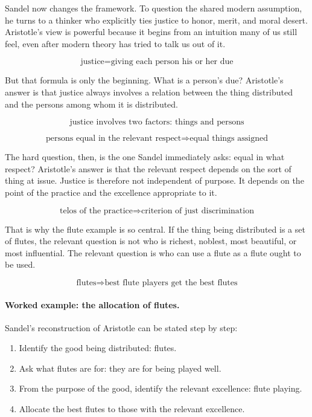 Sandel now changes the framework. To question the shared modern assumption, he turns to a thinker who explicitly ties justice to honor, merit, and moral desert. Aristotle's view is powerful because it begins from an intuition many of us still feel, even after modern theory has tried to talk us out of it.

\begin{equation}
\text{justice} = \text{giving each person his or her due}
\end{equation}

But that formula is only the beginning. What is a person's due? Aristotle's answer is that justice always involves a relation between the thing distributed and the persons among whom it is distributed.

\begin{equation}
\text{justice involves two factors: things and persons}
\end{equation}

\begin{equation}
\text{persons equal in the relevant respect}
\Longrightarrow
\text{equal things assigned}
\end{equation}

The hard question, then, is the one Sandel immediately asks: equal in what respect? Aristotle's answer is that the relevant respect depends on the sort of thing at issue. Justice is therefore not independent of purpose. It depends on the point of the practice and the excellence appropriate to it.

\begin{equation}
\text{telos of the practice}
\Longrightarrow
\text{criterion of just discrimination}
\end{equation}

That is why the flute example is so central. If the thing being distributed is a set of flutes, the relevant question is not who is richest, noblest, most beautiful, or most influential. The relevant question is who can use a flute as a flute ought to be used.

\begin{equation}
\text{flutes}
\Longrightarrow
\text{best flute players get the best flutes}
\end{equation}

\paragraph{Worked example: the allocation of flutes.} Sandel's reconstruction of Aristotle can be stated step by step:
\begin{enumerate}
\item Identify the good being distributed: flutes.
\item Ask what flutes are for: they are for being played well.
\item From the purpose of the good, identify the relevant excellence: flute playing.
\item Allocate the best flutes to those with the relevant excellence.
\end{enumerate}

